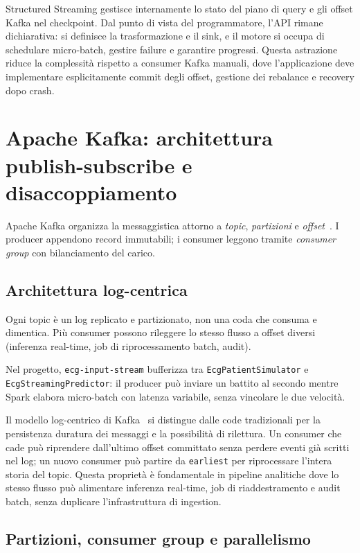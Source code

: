 Structured Streaming gestisce internamente lo stato del piano di query e gli offset Kafka nel checkpoint.
Dal punto di vista del programmatore, l'API rimane dichiarativa: si definisce la trasformazione e il sink, e il motore si occupa di schedulare micro-batch, gestire failure e garantire progressi.
Questa astrazione riduce la complessità rispetto a consumer Kafka manuali, dove l'applicazione deve implementare esplicitamente commit degli offset, gestione dei rebalance e recovery dopo crash.

\section{Apache Kafka: architettura publish-subscribe e disaccoppiamento}\label{sec:kafka}

Apache Kafka organizza la messaggistica attorno a \emph{topic}, \emph{partizioni} e \emph{offset}~\cite{kreps2011kafka,kleppmann2017designing}.
I producer appendono record immutabili; i consumer leggono tramite \emph{consumer group} con bilanciamento del carico.

\subsection{Architettura log-centrica}

Ogni topic è un log replicato e partizionato, non una coda che consuma e dimentica.
Più consumer possono rileggere lo stesso flusso a offset diversi (inferenza real-time, job di riprocessamento batch, audit).

Nel progetto, \texttt{ecg-input-stream} bufferizza tra \texttt{EcgPatientSimulator} e \texttt{EcgStreamingPredictor}: il producer può inviare un battito al secondo mentre Spark elabora micro-batch con latenza variabile, senza vincolare le due velocità.

Il modello log-centrico di Kafka~\cite{kreps2011kafka,kleppmann2017designing} si distingue dalle code tradizionali per la persistenza duratura dei messaggi e la possibilità di rilettura.
Un consumer che cade può riprendere dall'ultimo offset committato senza perdere eventi già scritti nel log; un nuovo consumer può partire da \texttt{earliest} per riprocessare l'intera storia del topic.
Questa proprietà è fondamentale in pipeline analitiche dove lo stesso flusso può alimentare inferenza real-time, job di riaddestramento e audit batch, senza duplicare l'infrastruttura di ingestion.

\subsection{Partizioni, consumer group e parallelismo}

